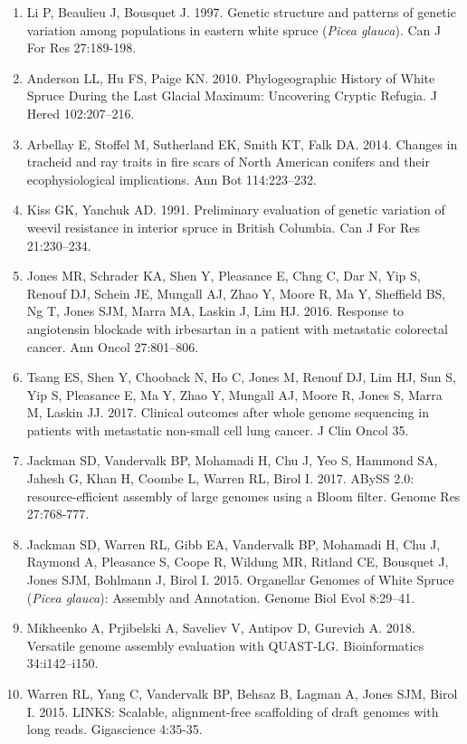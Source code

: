 \documentclass[titlepage,11pt, oneside]{article}   	%
\begin{document}
\begin{enumerate}
\item Li P, Beaulieu J, Bousquet J. 1997. Genetic structure and patterns of genetic variation among populations in eastern white spruce (\textit{Picea glauca}). Can J For Res 27:189-198.
\item Anderson LL, Hu FS, Paige KN. 2010. Phylogeographic History of White Spruce During the Last Glacial Maximum: Uncovering Cryptic Refugia. J Hered 102:207–216.
\item Arbellay E, Stoffel M, Sutherland EK, Smith KT, Falk DA. 2014. Changes in tracheid and ray traits in fire scars of North American conifers and their ecophysiological implications. Ann Bot 114:223–232.
\item Kiss GK, Yanchuk AD. 1991. Preliminary evaluation of genetic variation of weevil resistance in interior spruce in British Columbia. Can J For Res 21:230–234.
\item Jones MR, Schrader KA, Shen Y, Pleasance E, Chng C, Dar N, Yip S, Renouf DJ, Schein JE, Mungall AJ, Zhao Y, Moore R, Ma Y, Sheffield BS, Ng T, Jones SJM, Marra MA, Laskin J, Lim HJ. 2016. Response to angiotensin blockade with irbesartan in a patient with metastatic colorectal cancer. Ann Oncol 27:801–806.
\item Tsang ES, Shen Y, Chooback N, Ho C, Jones M, Renouf DJ, Lim HJ, Sun S, Yip S, Pleasance E, Ma Y, Zhao Y, Mungall AJ, Moore R, Jones S, Marra M, Laskin JJ. 2017. Clinical outcomes after whole genome sequencing in patients with metastatic non-small cell lung cancer. J Clin Oncol 35.
\item Jackman SD, Vandervalk BP, Mohamadi H, Chu J, Yeo S, Hammond SA, Jahesh G, Khan H, Coombe L, Warren RL, Birol I. 2017. ABySS 2.0: resource-efficient assembly of large 
genomes using a Bloom filter. Genome Res 27:768-777.
\item Jackman SD, Warren RL, Gibb EA, Vandervalk BP, Mohamadi H, Chu J, Raymond A, Pleasance S, Coope R, Wildung MR, Ritland CE, Bousquet J, Jones SJM, Bohlmann J, Birol I. 2015. Organellar Genomes of White Spruce (\textit{Picea glauca}): Assembly and Annotation. Genome Biol Evol 8:29–41.
\item Mikheenko A, Prjibelski A, Saveliev V, Antipov D, Gurevich A. 2018. Versatile genome assembly evaluation with QUAST-LG. Bioinformatics 34:i142–i150.
\item Warren RL, Yang C, Vandervalk BP, Behsaz B, Lagman A, Jones SJM, Birol I. 2015. LINKS: Scalable, alignment-free scaffolding of draft genomes with long reads. Gigascience 4:35-35.

\end{enumerate}
\end{document}
